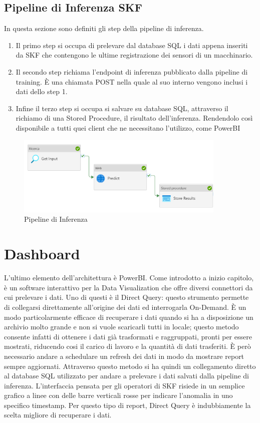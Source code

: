 \subsection{Pipeline di Inferenza SKF}
In questa sezione sono definiti gli step della pipeline di inferenza.
\begin{enumerate}
	\item Il primo step si occupa di prelevare dal database SQL i dati appena inseriti da SKF che contengono le ultime registrazione dei sensori di un macchinario. 
	\item Il secondo step richiama l'endpoint di inferenza pubblicato dalla pipeline di training. È una chiamata POST nella quale al suo interno vengono inclusi i dati dello step 1.
	\item Infine il terzo step si occupa si salvare su database SQL, attraverso il richiamo di una Stored Procedure, il risultato dell'inferenza. Rendendolo così disponibile a tutti quei client che ne necessitano l'utilizzo, come PowerBI
\end{enumerate}

\begin{figure}[t]
	\centering
	\includegraphics[width=10cm, scale=1]{images/pipeline-inference}
	\caption{Pipeline di Inferenza}
	\label{pipeline-inferenza}
\end{figure}

\section{Dashboard}
L'ultimo elemento dell'architettura è PowerBI. Come introdotto a inizio capitolo, è un software interattivo per la Data Visualization che offre diversi connettori da cui prelevare i dati. Uno di questi è il Direct Query: questo strumento permette di collegarsi direttamente all'origine dei dati ed interrogarla On-Demand. È un modo particolarmente efficace di recuperare i dati quando si ha a disposizione un archivio molto grande e non si vuole scaricarli tutti in locale; questo metodo consente infatti di ottenere i dati già trasformati e raggruppati, pronti per essere mostrati, riducendo cosi il carico di lavoro e la quantità di dati trasferiti. È però necessario andare a schedulare un refresh dei dati in modo da mostrare report sempre aggiornati. 
Attraverso questo metodo si ha quindi un collegamento diretto al database SQL utilizzato per andare a prelevare i dati salvati dalla pipeline di inferenza.
L'interfaccia pensata per gli operatori di SKF risiede in un semplice grafico a linee con delle barre verticali rosse per indicare l'anomalia in uno specifico timestamp. Per questo tipo di report, Direct Query è indubbiamente la scelta migliore di recuperare i dati.  


